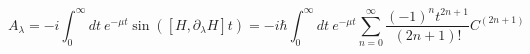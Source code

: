 \documentclass[11pt,a4paper]{article}
\begin{document}
\begin{equation}
A_{\lambda} =  -i\int_0^{\infty} dt\ e^{-\mu t}  \sin ( [H, \partial_{\lambda} H ]t)
= -i\hbar \int_0^{\infty} dt\ e^{-\mu t}  \sum_{n=0}^{\infty}  \dfrac{(-1)^{n} t ^{2n+1}}{(2n+1)!} C^{(2n+1)}
\end{equation}


%
%
\end{document}
